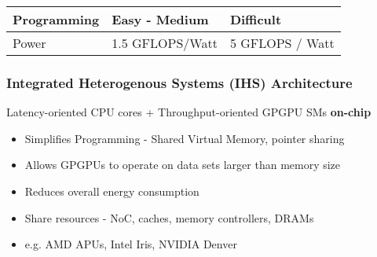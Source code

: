 \documentclass{beamer}
\begin{document}
\begin{frame}
\begin{table}[]
\begin{tabular}{@{}lll@{}}
	Programming                                                           & Easy - Medium                                                                                    & Difficult                                                                                     \\ \midrule
	Power                                                                 & 1.5 GFLOPS/Watt                                                                                  & 5 GFLOPS / Watt                                                                               \\ \bottomrule
\end{tabular}
\label{cpu-vs-gpu}
\end{table}
\end{frame}


\begin{frame}
\frametitle{Integrated Heterogenous Systems (IHS) Architecture}
Latency-oriented CPU cores + Throughput-oriented GPGPU SMs \textbf{on-chip} \\
\begin{itemize}
	\item Simplifies Programming - Shared Virtual Memory, pointer sharing
	\item Allows GPGPUs to operate on data sets larger than memory size %
	\item Reduces overall energy consumption
	\item Share resources - NoC, caches, memory controllers, DRAMs
	\item e.g. AMD APUs, Intel Iris, NVIDIA Denver
\end{itemize}
\begin{figure}[!htb]
	\centering
	\def\svgwidth{0.6\columnwidth}
	
	\label{fig:hsa-arch}
\end{figure}
\end{frame}

\end{document}
